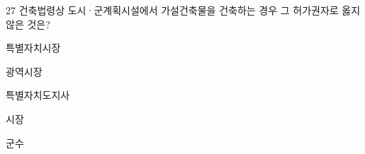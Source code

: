 \begin{question}{27}
건축법령상 도시·군계획시설에서 가설건축물을 건축하는 경우 그 허가권자로 옳지 않은 것은?
\begin{choices}
  \item 특별자치시장
  \item 광역시장
  \item 특별자치도지사
  \item 시장
  \item 군수
\end{choices}
\end{question}
